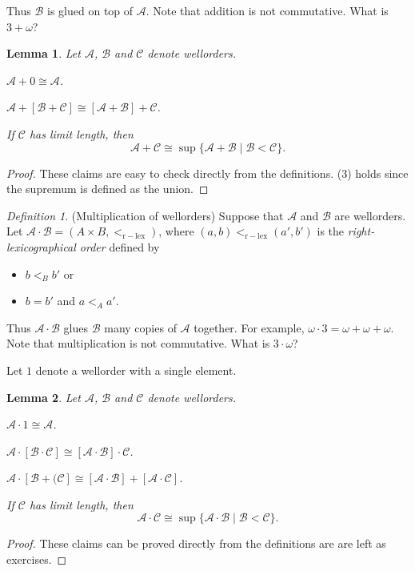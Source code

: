 \documentclass[a4paper, 11pt]{amsart}
\newtheorem{lemma}[lemma]{Lemma}
\theoremstyle{remark}
\newtheorem{definition}[definition]{Definition}
\newcommand{\cB}{\mathcal B}
\newcommand{\cA}{\mathcal A}
\newcommand{\cC}{\mathcal C}
\newenvironment{enumerate-(1)}{\begin{enumerate}[label={\upshape (\arabic*)}, leftmargin=2pc]}{\end{enumerate}}
\newenvironment{itemizenew}{\begin{itemize}[leftmargin=2pc]}{\end{itemize}}
\begin{document}
Thus $\cB$ is glued on top of $\cA$. 
Note that addition is not commutative. What is $3 + \omega$? 

\begin{lemma} 
Let $\cA$, $\cB$ and $\cC$ denote wellorders. 
\begin{enumerate-(1)} 
\item 
$\cA+0 \cong \cA$. 
\item 
$\cA+[\cB+\cC] \cong [\cA+\cB]+\cC$. 
\item 
If $\cC$ has limit length, then 
$$\cA+\cC \cong \sup \{\cA+\cB \mid \cB<\cC\}.$$ 
\end{enumerate-(1)} 
\end{lemma} 
\begin{proof} 
These claims are easy to check directly from the definitions. 
(3) holds since the supremum is defined as the union. 
\end{proof} 

\begin{definition}(Multiplication of wellorders) 
Suppose that $\cA$ and $\cB$ are wellorders. 
Let $\cA \cdot \cB= (A \times B, <_{\mathrm{r-lex}})$, where $(a,b)<_{\mathrm{r-lex}} (a',b')$ is the \emph{right-lexicographical order} defined by  
\begin{itemizenew} 
\item 
 $b<_B b'$ or 
\item 
$b=b'$ and $a<_A a'$. 
\end{itemizenew} 
\end{definition} 

Thus $\cA \cdot \cB$ glues $\cB$ many copies of $\cA$ together. 
For example, $\omega\cdot 3 = \omega + \omega +\omega$. 
Note that multiplication is not commutative. What is $3 \cdot \omega$? 

Let $1$ denote a wellorder with a single element. 

\begin{lemma} 
Let $\cA$, $\cB$ and $\cC$ denote wellorders. 
\begin{enumerate-(1)} 
\item 
$\cA\cdot 1 \cong  \cA$. 
\item 
$\cA \cdot [\cB \cdot \cC] \cong [\cA \cdot \cB] \cdot \cC$. 
\item 
$\cA \cdot [\cB+(\cC] \cong [\cA \cdot \cB] + [\cA \cdot \cC]$. 
\item 
If $\cC$ has limit length, then 
$$\cA \cdot \cC \cong \sup \{\cA \cdot \cB \mid \cB<\cC\}.$$ 
\end{enumerate-(1)} 
\end{lemma} 
\begin{proof} 
These claims can be proved directly from the definitions are are left as exercises. 
\end{proof} 
\end{document}
